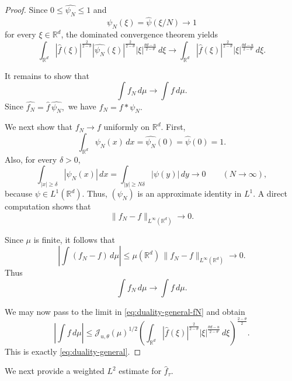 \documentclass[11pt]{amsart}
\numberwithin{equation}{section}
\renewcommand{\ge}{\geqslant}
\renewcommand{\le}{\leqslant}
\newcommand{\J}{\mathcal{J}}
\theoremstyle{plain}
\theoremstyle{remark}
\begin{document}
\begin{proof}
Since \(0\le \widehat{\psi_N}\le 1\) and
\[
\widehat{\psi_N}(\xi)=\widehat\psi(\xi/N)\to 1
\]
for every $\xi\in\mathbb R^d$, the dominated convergence theorem yields
\[
\int_{\mathbb R^d}
|\widehat f(\xi)|^{\frac{2}{2-\theta}}
|\widehat{\psi_N}(\xi)|^{\frac{2}{2-\theta}}
|\xi|^{\frac{\theta d-u}{2-\theta}}\,d\xi
\to
\int_{\mathbb R^d}
|\widehat f(\xi)|^{\frac{2}{2-\theta}}
|\xi|^{\frac{\theta d-u}{2-\theta}}\,d\xi.
\]

It remains to show that
\[
\int f_N\,d\mu\to \int f\,d\mu.
\]
Since $
\widehat{f_N}=\widehat f\,\widehat{\psi_N},
$
we have
$
f_N=f*\psi_N.
$

We next show that \(f_N\to f\) uniformly on \(\mathbb R^d\). First,
\[
\int_{\mathbb R^d}\psi_N(x)\,dx=\widehat{\psi_N}(0)=\widehat\psi(0)=1.
\]
Also, for every \(\delta>0\),
\[
\int_{|x|\ge \delta} |\psi_N(x)|\,dx
=
\int_{|y|\ge N\delta} |\psi(y)|\,dy
\to 0
\qquad (N\to\infty),
\]
because \(\psi\in L^1(\mathbb R^d)\). Thus, \((\psi_N)\) is an approximate identity in \(L^1\). A direct computation shows that
\[
\|f_N-f\|_{L^\infty(\mathbb R^d)}\to 0.
\]

Since \(\mu\) is finite, it follows that
\[
\left|\int (f_N-f)\,d\mu\right|
\le
\mu(\mathbb R^d)\,\|f_N-f\|_{L^\infty(\mathbb R^d)}
\to 0.
\]
Thus
\[
\int f_N\,d\mu\to \int f\,d\mu.
\]

We may now pass to the limit in \eqref{eq:duality-general-fN} and obtain
\[
\left|\int f\,d\mu\right|
\le
\J_{u,\theta}(\mu)^{1/2}
\left(
\int_{\mathbb R^d}
|\widehat f(\xi)|^{\frac{2}{2-\theta}}
|\xi|^{\frac{\theta d-u}{2-\theta}}\,d\xi
\right)^{\frac{2-\theta}{2}}.
\]
This is exactly \eqref{eq:duality-general}.
\end{proof}

We next provide a weighted $L^2$ estimate for $\widehat f_\tau$.
\end{document}
